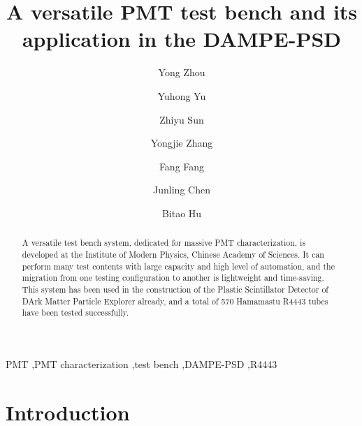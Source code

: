 \documentclass[review, times]{elsarticle}
\begin{document}
\begin{frontmatter}

\title{A versatile PMT test bench and its application in the DAMPE-PSD}

\author[imp,lzu,ucas]{Yong Zhou}

\author[imp]{Yuhong Yu}

\author[imp]{Zhiyu Sun}

\author[imp]{Yongjie Zhang}
\author[imp]{Fang Fang}
\author[imp]{Junling Chen}

\author[lzu]{Bitao Hu}

\address[imp]{Institute of Modern Physicas, Chinese Academy of Sciences,  509 Nanchang Road,  Lanzhou,  730000,  P.R.China}
\address[lzu]{School of Nuclear Science and Technology,  Lanzhou University,  222 South Tianshui Road,  Lanzhou,  730000,  P.R.China}
\address[ucas]{Graduate University of the Chinese Academy of Sciences,  19A Yuquan Road,  Beijing,  100049,  P.R.China}

\begin{abstract}

A versatile test bench system, dedicated for massive PMT characterization, is developed at the Institute of Modern Physics, Chinese Academy of Sciences. 
It can perform many test contents with large capacity and high level of automation, and the migration from one testing configuration to another is lightweight and time-saving. 
This system has been used in the construction of the Plastic Scintillator Detector of DArk Matter Particle Explorer already, and a total of 570 Hamamastu R4443 tubes have been tested successfully.
\end{abstract}

\begin{keyword}
PMT
\sep PMT characterization
\sep test bench
\sep DAMPE-PSD
\sep R4443


\end{keyword}

\end{frontmatter}

\linenumbers
\section{Introduction}
\label{sec:introduction}
\end{document}
